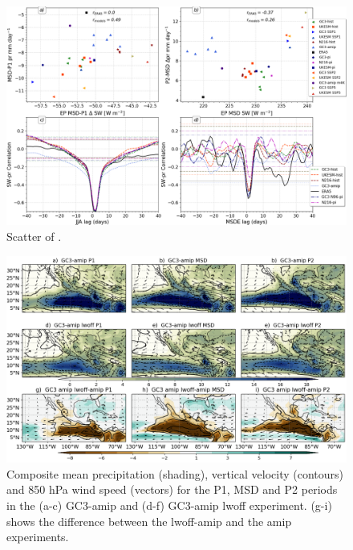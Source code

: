 \begin{figure}[t!]
\includegraphics[width=\linewidth]{figures/cloud_scatter_f.png}
\caption{Scatter of .}
\label{fig:cloud_scatter}
\end{figure}



 
\begin{figure}[t!]
\includegraphics[width=\linewidth]{figures/lwfig_clim_1.png}
\caption{Composite mean precipitation (shading), vertical velocity (contours) and 850 hPa wind speed (vectors) for the P1, MSD and P2 periods in the (a-c) GC3-amip and (d-f) GC3-amip lwoff experiment. (g-i) shows the difference between the lwoff-amip and the amip experiments.}
\label{fig:lwoff}
\end{figure}

